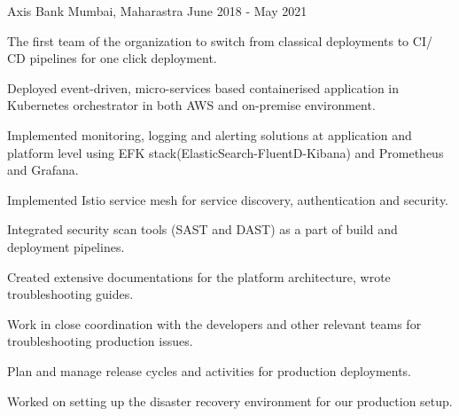 \begin{cventries}
    {Axis Bank} %
    {Mumbai, Maharastra} %
    {June 2018 - May 2021} %
    {
      \begin{cvitems} %
        \item {The first team of the organization to switch from classical deployments to CI/ CD pipelines for one click deployment.}
        \item {Deployed event-driven, micro-services based containerised application in Kubernetes orchestrator in both AWS and on-premise environment.}
        \item {Implemented monitoring, logging and alerting solutions at application and platform level using EFK stack(ElasticSearch-FluentD-Kibana) and Prometheus and Grafana.}
        \item {Implemented Istio service mesh for service discovery, authentication and security.}
        \item {Integrated security scan tools (SAST and DAST) as a part of build and deployment pipelines.}
        \item {Created extensive documentations for the platform architecture, wrote troubleshooting guides.}
        \item {Work in close coordination with the developers and other relevant teams for troubleshooting production issues.}
        \item {Plan and manage release cycles and activities for production deployments.}
        \item {Worked on setting up the disaster recovery environment for our production setup.}
          \end{cvitems}
    }
\end{cventries}
